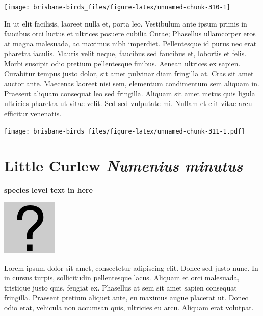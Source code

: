 \documentclass[]{book}
\let\origfigure\figure
\let\endorigfigure\endfigure
\renewenvironment{figure}[1][2] {
  \expandafter\origfigure\expandafter[H]
} {
  \endorigfigure
}
\begin{document}
\begin{figure}
\texttt{[image: brisbane-birds\_files/figure-latex/unnamed-chunk-310-1]} \caption{insert figure caption}\label{fig:unnamed-chunk-310}
\end{figure}

In ut elit facilisis, laoreet nulla et, porta leo. Vestibulum ante ipsum
primis in faucibus orci luctus et ultrices posuere cubilia Curae;
Phasellus ullamcorper eros at magna malesuada, ac maximus nibh
imperdiet. Pellentesque id purus nec erat pharetra iaculis. Mauris velit
neque, faucibus sed faucibus et, lobortis et felis. Morbi suscipit odio
pretium pellentesque finibus. Aenean ultrices ex sapien. Curabitur
tempus justo dolor, sit amet pulvinar diam fringilla at. Cras sit amet
auctor ante. Maecenas laoreet nisi sem, elementum condimentum sem
aliquam in. Praesent aliquam consequat leo sed fringilla. Aliquam sit
amet metus quis ligula ultricies pharetra ut vitae velit. Sed sed
vulputate mi. Nullam et elit vitae arcu efficitur venenatis.

\begin{figure}
\centering
\texttt{[image: brisbane-birds\_files/figure-latex/unnamed-chunk-311-1.pdf]}
\caption{\label{fig:unnamed-chunk-311}insert figure caption}
\end{figure}

\section{\texorpdfstring{Little Curlew \emph{Numenius
minutus}}{Little Curlew Numenius minutus}}\label{little-curlew-numenius-minutus}

\textbf{species level text in here}

\begin{figure}
\centering
\includegraphics{assets/missing.png}
\caption{No image for species}
\end{figure}

Lorem ipsum dolor sit amet, consectetur adipiscing elit. Donec sed justo
nunc. In in cursus turpis, sollicitudin pellentesque lacus. Aliquam et
orci malesuada, tristique justo quis, feugiat ex. Phasellus at sem sit
amet sapien consequat fringilla. Praesent pretium aliquet ante, eu
maximus augue placerat ut. Donec odio erat, vehicula non accumsan quis,
ultricies eu arcu. Aliquam erat volutpat.
\end{document}
